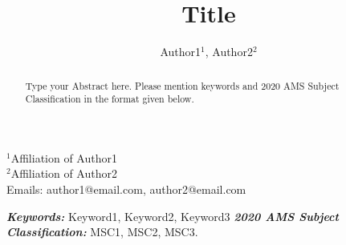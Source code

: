 \documentclass[amstex,12pt,reqno]{article}
\date{}
\title{Title}
\author{Author1${}^{1}$, Author2${}^{2}$}
\providecommand{\keywords}[1]{\textbf{\textit{Keywords:}} #1}
\begin{document}
\maketitle
\begin{center} ${}^{1}$Affiliation of Author1\\ ${}^{2}$Affiliation of Author2\\
Emails: author1@email.com, author2@email.com
\end{center}

\begin{abstract}
Type your Abstract here. Please mention keywords and 2020 AMS Subject Classification  in the format given below.
\end{abstract}
\keywords{Keyword1, Keyword2, Keyword3}\newline
\newline
{\bf \emph{ 2020 AMS Subject Classification:}} MSC1, MSC2, MSC3.
\end{document}

